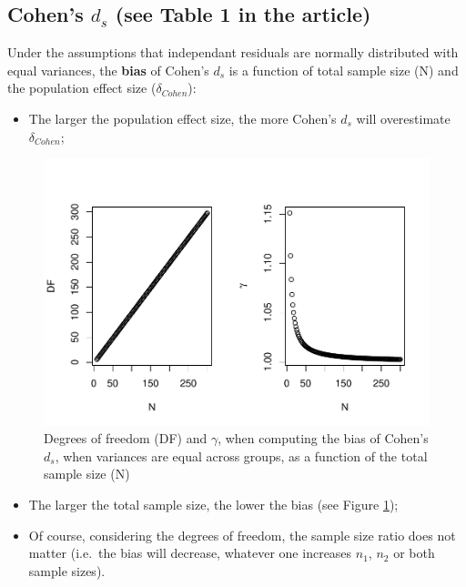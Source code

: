 \documentclass[
  man]{apa6}
\providecommand{\tightlist}{%
  \setlength{\itemsep}{0pt}\setlength{\parskip}{0pt}}
\begin{document}
\hypertarget{cohens-d_s-see-table-1-in-the-article}{%
\subsection{\texorpdfstring{Cohen's \(d_s\) (see Table 1 in the article)}{Cohen's d\_s (see Table 1 in the article)}}\label{cohens-d_s-see-table-1-in-the-article}}

Under the assumptions that independant residuals are normally distributed with equal variances, the \textbf{bias} of Cohen's \(d_s\) is a function of total sample size (N) and the population effect size (\(\delta_{Cohen}\)):

\begin{itemize}
\tightlist
\item
  The larger the population effect size, the more Cohen's \(d_s\) will overestimate \(\delta_{Cohen}\);
\end{itemize}

\begin{figure}
\centering
\includegraphics{Theoretical-Bias-of-all-estimators-as-a-function-of-population-parameters_files/figure-latex/biascohendNsize2-1.pdf}
\caption{\label{fig:biascohendNsize2}Degrees of freedom (DF) and \(\gamma\), when computing the bias of Cohen's \(d_s\), when variances are equal across groups, as a function of the total sample size (N)}
\end{figure}

\begin{itemize}
\item
  The larger the total sample size, the lower the bias (see Figure \ref{fig:biascohendNsize2});
\item
  Of course, considering the degrees of freedom, the sample size ratio does not matter (i.e.~the bias will decrease, whatever one increases \(n_1\), \(n_2\) or both sample sizes).
\end{itemize}


\end{document}
